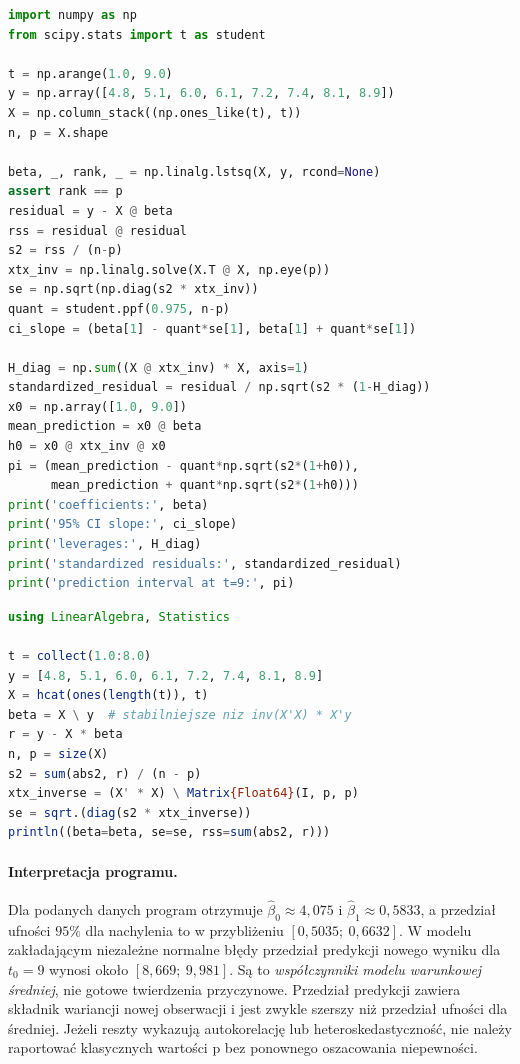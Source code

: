 \begin{lstlisting}[language=Python,caption={Kompletny program: MNK, przedział dla nachylenia, diagnostyka dźwigni i predykcja (NumPy, SciPy).}]
import numpy as np
from scipy.stats import t as student

t = np.arange(1.0, 9.0)
y = np.array([4.8, 5.1, 6.0, 6.1, 7.2, 7.4, 8.1, 8.9])
X = np.column_stack((np.ones_like(t), t))
n, p = X.shape

beta, _, rank, _ = np.linalg.lstsq(X, y, rcond=None)
assert rank == p
residual = y - X @ beta
rss = residual @ residual
s2 = rss / (n-p)
xtx_inv = np.linalg.solve(X.T @ X, np.eye(p))
se = np.sqrt(np.diag(s2 * xtx_inv))
quant = student.ppf(0.975, n-p)
ci_slope = (beta[1] - quant*se[1], beta[1] + quant*se[1])

H_diag = np.sum((X @ xtx_inv) * X, axis=1)
standardized_residual = residual / np.sqrt(s2 * (1-H_diag))
x0 = np.array([1.0, 9.0])
mean_prediction = x0 @ beta
h0 = x0 @ xtx_inv @ x0
pi = (mean_prediction - quant*np.sqrt(s2*(1+h0)),
      mean_prediction + quant*np.sqrt(s2*(1+h0)))
print('coefficients:', beta)
print('95% CI slope:', ci_slope)
print('leverages:', H_diag)
print('standardized residuals:', standardized_residual)
print('prediction interval at t=9:', pi)
\end{lstlisting}

\begin{lstlisting}[language=Julia,caption={MNK poprzez rozkład QR i błąd standardowy w Julii (standardowe LinearAlgebra, Statistics).}]
using LinearAlgebra, Statistics

t = collect(1.0:8.0)
y = [4.8, 5.1, 6.0, 6.1, 7.2, 7.4, 8.1, 8.9]
X = hcat(ones(length(t)), t)
beta = X \ y  # stabilniejsze niz inv(X'X) * X'y
r = y - X * beta
n, p = size(X)
s2 = sum(abs2, r) / (n - p)
xtx_inverse = (X' * X) \ Matrix{Float64}(I, p, p)
se = sqrt.(diag(s2 * xtx_inverse))
println((beta=beta, se=se, rss=sum(abs2, r)))
\end{lstlisting}

\paragraph{Interpretacja programu.}
Dla podanych danych program otrzymuje \(\widehat\beta_0\approx4{,}075\)
i \(\widehat\beta_1\approx0{,}5833\), a przedział ufności
$95\%$ dla nachylenia to w przybliżeniu
$[0{,}5035;\ 0{,}6632]$. W modelu zakładającym
niezależne normalne błędy przedział predykcji nowego
wyniku dla $t_0=9$ wynosi około $[8{,}669;\ 9{,}981]$.
Są to \emph{współczynniki modelu warunkowej średniej},
nie gotowe twierdzenia przyczynowe. Przedział predykcji zawiera składnik
wariancji nowej obserwacji i jest zwykle szerszy
niż przedział ufności dla średniej. Jeżeli reszty
wykazują autokorelację lub heteroskedastyczność,
nie należy raportować klasycznych wartości p bez
ponownego oszacowania niepewności.

